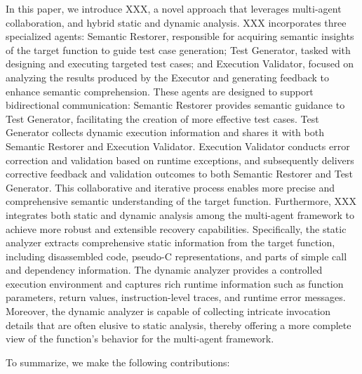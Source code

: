 \documentclass[acmsmall,screen,review,anonymous]{acmart} %
\begin{document}
In this paper, we introduce XXX, a novel approach that leverages multi-agent collaboration, and hybrid static and dynamic analysis. XXX incorporates three specialized agents: Semantic Restorer, responsible for acquiring semantic insights of the target function to guide test case generation; Test Generator, tasked with designing and executing targeted test cases; and Execution Validator, focused on analyzing the results produced by the Executor and generating feedback to enhance semantic comprehension. These agents are designed to support bidirectional communication: Semantic Restorer provides semantic guidance to Test Generator, facilitating the creation of more effective test cases. Test Generator collects dynamic execution information and shares it with both Semantic Restorer and Execution Validator. Execution Validator conducts error correction and validation based on runtime exceptions, and subsequently delivers corrective feedback and validation outcomes to both Semantic Restorer and Test Generator. This collaborative and iterative process enables more precise and comprehensive semantic understanding of the target function.
Furthermore, XXX integrates both static and dynamic analysis among the multi-agent framework to achieve more robust and extensible recovery capabilities. Specifically, the static analyzer extracts comprehensive static information from the target function, including disassembled code, pseudo-C representations, and parts of simple call and dependency information. The dynamic analyzer provides a controlled execution environment and captures rich runtime information such as function parameters, return values, instruction-level traces, and runtime error messages. Moreover, the dynamic analyzer is capable of collecting intricate invocation details that are often elusive to static analysis, thereby offering a more complete view of the function's behavior for the multi-agent framework.

To summarize, we make the following contributions:
\end{document}
